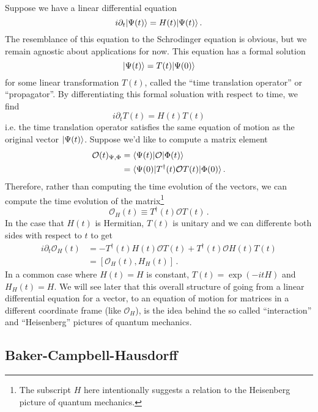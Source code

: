 Suppose we have a linear differential equation
\begin{equation}
  i \partial_t | \Psi(t) \rangle = H(t) | \Psi(t) \rangle \, .
\end{equation}
The resemblance of this equation to the Schrodinger equation is obvious, but we remain agnostic about applications for now.
This equation has a formal solution
\begin{equation}
  | \Psi(t) \rangle = T(t) | \Psi(0) \rangle
\end{equation}
for some linear transformation $T(t)$, called the ``time translation operator'' or ``propagator''.
By differentiating this formal soluation with respect to time, we find
\begin{equation}
  i \partial_t T(t) = H(t) T(t)
\end{equation}
i.e. the time translation operator satisfies the same equation of motion as the original vector $| \Psi(t) \rangle$.
Suppose we'd like to compute a matrix element
\begin{align}
  \mathcal{O}(t)_{\Psi,\Phi}
  &= \langle \Psi(t) | \mathcal{O} | \Phi(t) \rangle \nonumber \\
  &= \langle \Psi(0) | T^\dagger(t) \mathcal{O}T(t) | \Phi(0) \rangle
  \, .
\end{align}
Therefore, rather than computing the time evolution of the vectors, we can compute the time evolution of the matrix\footnote{The subscript $H$ here intentionally suggests a relation to the Heisenberg picture of quantum mechanics.}
\begin{equation}
  \mathcal{O}_H(t) \equiv T^\dagger(t) \mathcal{O} T(t)
  \, .
\end{equation}
In the case that $H(t)$ is Hermitian, $T(t)$ is unitary and we can differente both sides with respect to $t$ to get
\begin{align}
  i \partial_t \mathcal{O}_H(t)
  &= -T^\dagger(t) H(t) \mathcal{O} T(t)
     + T^\dagger(t) \mathcal{O} H(t) T(t) \nonumber \\
  &= \left[ \mathcal{O}_H(t), H_H(t) \right]
  \, .
\end{align}
In a common case where $H(t) = H$ is constant, $T(t) = \exp(-i t H)$ and $H_H(t) = H$.
We will see later that this overall structure of going from a linear differential equation for a vector, to an equation of motion for matrices in a different coordinate frame (like $\mathcal{O}_H$), is the idea behind the so called ``interaction'' and ``Heisenberg'' pictures of quantum mechanics.


\subsection{Baker-Campbell-Hausdorff}

